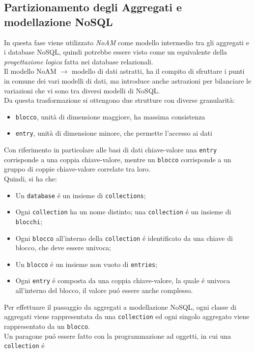 \subsection{Partizionamento degli Aggregati e modellazione NoSQL}
In questa fase viene utilizzato \emph{NoAM} come modello intermedio tra gli aggregati e i database NoSQL, quindi potrebbe
essere visto come un equivalente della \emph{progettazione logica} fatta nei database relazionali.\\
Il modello NoAM $\to$ modello di dati astratti, ha il compito di sfruttare i punti in comune dei vari modelli di dati, ma
introduce anche astrazioni per bilanciare le variazioni che vi sono tra diversi modelli di NoSQL.\\
Da questa trasformazione si ottengono due strutture con diverse granularità:\\
\begin{itemize}
    \item \texttt{blocco}, unità di dimensione maggiore, ha massima consistenza
    \item \texttt{entry}, unità di dimensione minore, che permette l'accesso ai dati
\end{itemize}
Con riferimento in particolare alle basi di dati chiave-valore una \texttt{entry} corrisponde a una coppia chiave-valore, mentre
un \texttt{blocco} corrisponde a un gruppo di coppie chiave-valore correlate tra loro.\\
Quindi, si ha che:
\begin{itemize}
    \item Un \texttt{database} é un insieme di \texttt{collections};
    \item Ogni \texttt{collection} ha un nome distinto; una \texttt{collection} é un insieme di \texttt{blocchi};
    \item Ogni \texttt{blocco} all'interno della \texttt{collection} é identificato da una chiave di blocco, che deve essere univoca;
    \item Un \texttt{blocco} é un insieme non vuoto di \texttt{entries};
    \item Ogni \texttt{entry} é composta da una coppia chiave-valore, la quale é univoca all'interno del blocco, il valore puó essere anche complesso.
\end{itemize}
Per effettuare il passaggio da aggregati a modellazione NoSQL, ogni classe di aggregati viene rappresentata da una \texttt{collection} ed
ogni singolo aggregato viene rappresentato da un \texttt{blocco}.\\
Un paragone puó essere fatto con la programmazione ad oggetti, in cui una \texttt{collection} é
